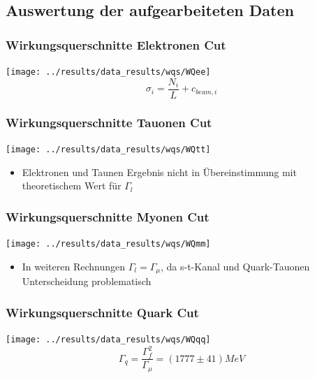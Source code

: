 \subsection{Auswertung der aufgearbeiteten Daten}
\begin{frame}
	\frametitle{Wirkungsquerschnitte Elektronen Cut}
	\centering
	\texttt{[image: ../results/data\_results/wqs/WQee]}
	\begin{equation*}
	\sigma_i=\frac{N_i}{L}+c_{beam,i}
	\end{equation*}
\end{frame}
\begin{frame}
	\frametitle{Wirkungsquerschnitte Tauonen Cut}
	\centering
	\texttt{[image: ../results/data\_results/wqs/WQtt]}
	\begin{itemize}
		\item Elektronen und Taunen Ergebnis nicht in Übereinstimmung mit theoretischem Wert für $\Gamma_l$
	\end{itemize}
\end{frame}
\begin{frame}
	\frametitle{Wirkungsquerschnitte Myonen Cut}
	\centering
	\texttt{[image: ../results/data\_results/wqs/WQmm]}
	\begin{itemize}
		\item In weiteren Rechnungen $\Gamma_l=\Gamma_\mu$, da s-t-Kanal und Quark-Tauonen Unterscheidung problematisch
	\end{itemize}
\end{frame}
\begin{frame}
	\frametitle{Wirkungsquerschnitte Quark Cut}
	\centering
	\texttt{[image: ../results/data\_results/wqs/WQqq]}
	\begin{equation*}
		\Gamma_q=\frac{\Gamma_f^2}{\Gamma_\mu}=(1777\pm41)\unit{MeV}
	\end{equation*}
\end{frame}
